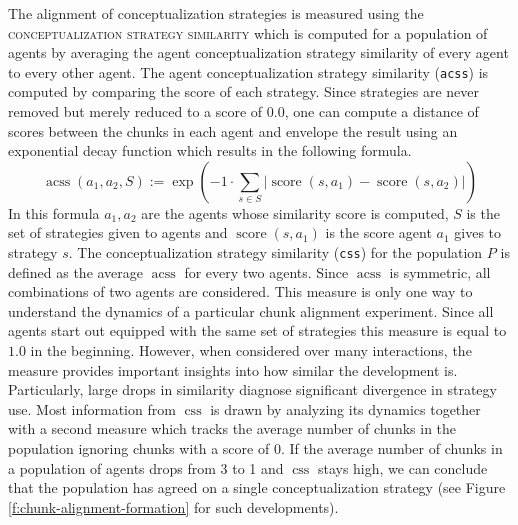 The alignment of conceptualization strategies is measured using the
\textsc{conceptualization strategy similarity} which is computed for a population of agents 
by averaging the {agent conceptualization strategy similarity} of every agent to every other
agent. The agent conceptualization strategy similarity ({\footnotesize\tt acss}) is computed by comparing
the score of each strategy. Since strategies are never removed but merely reduced
to a score of $0.0$, one can compute a distance of scores between the chunks in each agent
and envelope the result using an exponential decay function which results in the following formula.
\begin{equation}
\operatorname{acss}(a_1,a_2,S):= \operatorname{exp} \left( -1 \cdot \sum_{s \in S} \left|\operatorname{score}(s,a_1) - \operatorname{score}(s,a_2)\right|\right) 
\end{equation}
In this formula $a_1,a_2$ are the agents whose similarity score is computed, $S$ is the set 
of strategies given
to agents and $\operatorname{score}(s,a_1)$ is the score agent $a_1$ gives to strategy $s$.
The conceptualization strategy similarity ({\footnotesize\tt css}) for the population $P$ is defined 
as the average $\operatorname{acss}$
for every two agents. Since $\operatorname{acss}$ is symmetric, all combinations of two agents are
considered. This measure is only one way to understand the dynamics of a particular chunk alignment 
experiment. Since all agents start out equipped with the same set of strategies this measure is equal to $1.0$
in the beginning. However, when considered over many interactions, the measure provides important insights 
into how similar the development is. Particularly, large drops in similarity diagnose significant divergence in strategy use. Most information from $\operatorname{css}$ is drawn by analyzing its dynamics together with a 
second measure which tracks the average number of chunks in the population ignoring chunks with a 
score of $0$. If the average number of chunks in a population of agents drops from 3 to 1 and 
$\operatorname{css}$ stays
high, we can conclude that the population has agreed on a single conceptualization strategy (see Figure
\ref{f:chunk-alignment-formation} for such developments). 

